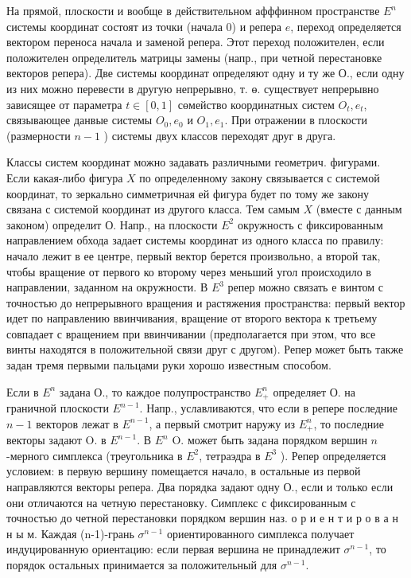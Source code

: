 \documentclass[10pt]{article}
\begin{document}
На прямой, плоскости и вообще в действительном афффинном пространстве $E^{n}$ системы координат состоят из точки (начала 0) и репера $e$, переход определяется вектором переноса начала и заменой репера. Этот переход положителен, если положителен определитель матрицы замены (напр., при четной перестановке векторов репера). Две системы координат определяют одну и ту же О., если одну из них можно перевести в другую непрерывно, т. ө. существует непрерывно зависящее от параметра $t \in[0,1]$ сөмейство координатных систем $O_{t}, e_{t}$, связывающее данвые системы $O_{0}, e_{0}$ и $O_{1}, e_{1}$. При отражении в плоскости (размерности $n-1$ ) системы двух классов переходят друг в друга.



Классы систем координат можно задавать различными геометрич. фигурами. Если какая-либо фигура $X$ по определенному закону связывается с системой координат, то зеркально симметричная ей фигура будет по тому же закону связана с системой координат из другого класса. Тем самым $X$ (вместе с данным законом) определит О. Напр., на плоскости $E^{2}$ окружность с фиксированным направлением обхода задает системы координат из одного класса по правилу: начало лежит в ее центре, первый вектор берется произвольно, а второй так, чтобы вращение от первого ко второму через меньший угол происходило в направлении, заданном на окружности. В $E^{3}$ репер можно связать $е$ винтом с точностью до непрерывного вращения и растяжения пространства: первый вектор идет по направлению ввинчивания, вращение от второго вектора к третьему совпадает с вращением при ввинчивании (предполагается при этом, что все винты находятся в положительной связи друг с другом). Репер может быть также задан тремя первыми пальцами руки хорошо известным способом.



Если в $E^{n}$ задана О., то каждое полупространство $E_{+}^{n}$ определяет О. на граничной плоскости $E^{n-1}$. Напр., уславливаются, что если в репере последние $n-1$ векторов лежат в $E^{n-1}$, а первый смотрит наружу из $E_{+}^{n}$, то последние векторы задают O. в $E^{n-1}$. В $E^{n}$ O. может быть задана порядком вершин $n$-мерного симплекса (треугольника в $E^{2}$, тетраэдра в $E^{3}$ ). Репер определяется условием: в первую вершину помещается начало, в остальные из первой направляются векторы репера. Два порядка задают одну О., если и только если они отличаются на четную перестановку. Симплекс с фиксированным с точностью до четной перестановки порядком вершин наз. о р и е н т и р о в а н н ы м. Каждая (n-1)-грань $\sigma^{n-1}$ ориентированного симплекса получает индуцированную ориентацию: если первая вершина не принадлежит $\sigma^{n-1}$, то порядок остальных принимается за положительный для $\sigma^{n-1}$.
\end{document}
